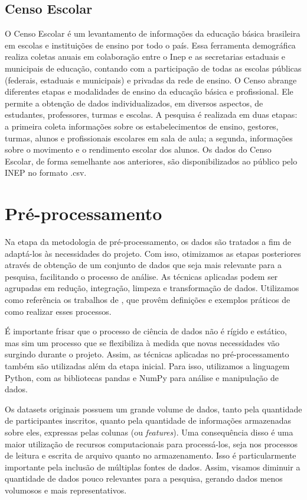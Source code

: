 \subsection{Censo Escolar}
O Censo Escolar é um levantamento de informações da educação básica brasileira em escolas e instituições de ensino por todo o país. Essa ferramenta demográfica realiza coletas anuais em colaboração entre o Inep e as secretarias estaduais e municipais de educação, contando com a participação de todas as escolas públicas (federais, estaduais e municipais) e privadas da rede de ensino. O Censo abrange diferentes etapas e modalidades de ensino da educação básica e profissional. Ele permite a obtenção de dados individualizados, em diversos aspectos, de estudantes, professores, turmas e escolas. A pesquisa é realizada em duas etapas: a primeira coleta informações sobre os estabelecimentos de ensino, gestores, turmas, alunos e profissionais escolares em sala de aula; a segunda, informações sobre o movimento e o rendimento escolar dos alunos. Os dados do Censo Escolar, de forma semelhante aos anteriores, são disponibilizados ao público pelo INEP no formato .csv. 


\section{Pré-processamento}
\label{sec:pre-processamento}
Na etapa da metodologia de pré-processamento, os dados são tratados a fim de adaptá-los às necessidades do projeto.
Com isso, otimizamos as etapas posteriores através de obtenção de um conjunto de dados que seja mais relevante para a pesquisa, facilitando o processo de análise. 
As técnicas aplicadas podem ser agrupadas em redução, integração, limpeza e transformação de dados. Utilizamos como referência os trabalhos de \citet{Jafari2022, Garcia2016},
que provêm definições e exemplos práticos de como realizar esses processos.

É importante frisar que o processo de ciência de dados não é rígido e estático, mas sim um processo que se flexibiliza à medida que novas necessidades vão surgindo durante o projeto. Assim, as técnicas aplicadas no pré-processamento também são utilizadas além da etapa inicial. Para isso, utilizamos a linguagem Python, com as bibliotecas pandas e NumPy para análise e manipulação de dados.

Os datasets originais possuem um grande volume de dados, tanto pela quantidade de participantes inscritos, 
quanto pela quantidade de informações armazenadas sobre eles, expressas pelas colunas (ou \textit{features}). 
Uma consequência disso é uma maior utilização de recursos computacionais para processá-los, seja nos processos 
de leitura e escrita de arquivo quanto no armazenamento. Isso é particularmente importante pela inclusão de múltiplas fontes de dados. 
Assim, visamos diminuir a quantidade de dados pouco relevantes para a pesquisa, gerando dados menos volumosos e mais representativos. 

